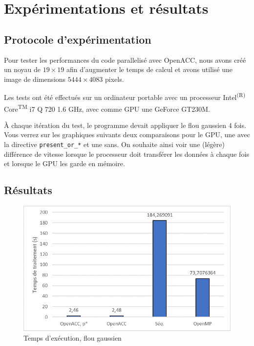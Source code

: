 \documentclass[11pt]{report}
\begin{document}
	\section{Expérimentations et résultats}

		\subsection{Protocole d'expérimentation}
				Pour tester les performances du code parallelisé avec OpenACC, nous avons créé un noyau de $19 \times 19$ afin d'augmenter le temps de calcul et avons utilisé une image de dimensions $5444 \times 4083$ pixels.
		
		\bigskip
		Les tests ont été effectués sur un ordinateur portable avec un processeur Intel\textsuperscript{(R)} Core\textsuperscript{TM} i7 Q 720 \@ 1.6 GHz, avec comme GPU une GeForce GT230M.
		
		À chaque itération du test, le programme devait appliquer le flou gaussien 4 fois. Vous verrez sur les graphiques suivants deux comparaisons pour le GPU, une avec la directive \texttt{present\_or\_*} et une sans. On souhaite ainsi voir une (légère) différence de vitesse lorsque le processeur doit transférer les données à chaque fois et lorsque le GPU les garde en mémoire.
		
		\subsection{Résultats}
		
		\begin{figure}[H]
			\centering
			\includegraphics[scale=0.8]{Images/graph_temps.png}
			\caption{Temps d'exécution, flou gaussien}
		\end{figure}
		
\end{document}
